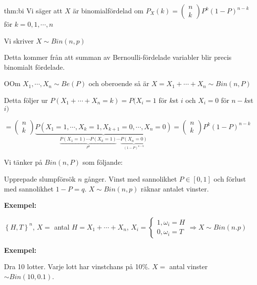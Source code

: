 \par\bigskip
\begin{theo}{thm:bi}
  Vi säger att $X$ är binomialfördelad om $P_X(k) = \begin{pmatrix}n\\k\end{pmatrix}P^k(1-P)^{n-k}$ för $k = 0,1,\cdots,n$
  \par\bigskip
  \noindent Vi skriver $X\sim Bin(n,p)$
\end{theo}
\par\bigskip
\noindent Detta kommer från att summan av Bernoulli-fördelade variabler blir precis binomialt fördelade.
\par\bigskip
\begin{theo}
  OOm $X_1,\cdots, X_n \sim Be(P)$ och oberoende så är $X = X_1+\cdots+X_n\sim Bin(n,P)$
\end{theo}
\par\bigskip
\noindent Detta följer ur $P(X_1+\cdots+X_n = k) = P(X_i=1$ för $k$st $i$ och $X_i=0$ för $n-k$st $i) $\par
\noindent $= \begin{pmatrix}n\\k\end{pmatrix}\underbrace{P(X_1=1,\cdots, X_k=1,X_{k+1}=0,\cdots,X_{n}=0)}_{\text{$\underbrace{P(X_1=1)\cdots P(X_k=1)}_{\text{$P^k$}}\cdots \underbrace{P(X_n = 0)}_{\text{$(1-P)^{n-k}$}}$}} = \begin{pmatrix}n\\k\end{pmatrix}P^k(1-P)^{n-k}$
\par\bigskip
\noindent Vi tänker på $Bin(n,P)$ som följande:\par
\noindent Upprepade slumpförsök $n$ gånger. Vinst med sannolikhet $P\in[0,1]$ och förlust med sannolikhet $1-P = q$. $X\sim Bin(n,p)$ räknar antalet vinster.
\par\bigskip
\noindent\textbf{Exempel:}\par
\noindent $\left\{H,T\right\}^n$, $X=$ antal $H = X_1+\cdots+X_n$, $X_i=\begin{cases}1, \omega_i = H\\0, \omega_i = T\end{cases}\Rightarrow X\sim Bin(n.p)$
\par\bigskip
\noindent\textbf{Exempel:}\par
\noindent Dra 10 lotter. Varje lott har vinstchans på 10\%. $X = $ antal vinster $\sim Bin(10,0.1)$.\par
